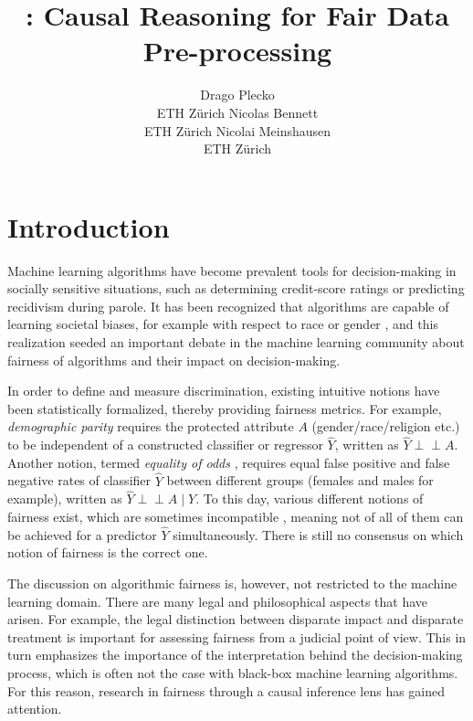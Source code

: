 \documentclass[
  nojss]{jss}
\author{
Drago Plecko\\ETH Zürich \And Nicolas Bennett\\ETH Zürich \And Nicolai Meinshausen\\ETH Zürich
}
\title{\pkg{fairadapt}: Causal Reasoning for Fair Data Pre-processing}
\begin{document}
\hypertarget{introduction}{%
\section{Introduction}\label{introduction}}

Machine learning algorithms have become prevalent tools for
decision-making in socially sensitive situations, such as determining
credit-score ratings or predicting recidivism during parole. It has been
recognized that algorithms are capable of learning societal biases, for
example with respect to race \citep{larson2016recidivism} or gender
\citep{lambrecht2019algorithmic, blau2003pay}, and this realization
seeded an important debate in the machine learning community about
fairness of algorithms and their impact on decision-making.

In order to define and measure discrimination, existing intuitive
notions have been statistically formalized, thereby providing fairness
metrics. For example, \emph{demographic parity}
\citep{darlington1971fairness} requires the protected attribute \(A\)
(gender/race/religion etc.) to be independent of a constructed
classifier or regressor \(\widehat{Y}\), written as
\(\widehat{Y} {\perp\!\!\!\perp}A\). Another notion, termed
\emph{equality of odds} \citep{hardt2016eosl}, requires equal false
positive and false negative rates of classifier \(\widehat{Y}\) between
different groups (females and males for example), written as
\(\widehat{Y} {\perp\!\!\!\perp}A \mid Y\). To this day, various
different notions of fairness exist, which are sometimes incompatible
\citep{corbett2018measure}, meaning not of all of them can be achieved
for a predictor \(\widehat{Y}\) simultaneously. There is still no
consensus on which notion of fairness is the correct one.

The discussion on algorithmic fairness is, however, not restricted to
the machine learning domain. There are many legal and philosophical
aspects that have arisen. For example, the legal distinction between
disparate impact and disparate treatment \citep{mcginley2011ricci} is
important for assessing fairness from a judicial point of view. This in
turn emphasizes the importance of the interpretation behind the
decision-making process, which is often not the case with black-box
machine learning algorithms. For this reason, research in fairness
through a causal inference lens has gained attention.
\end{document}
